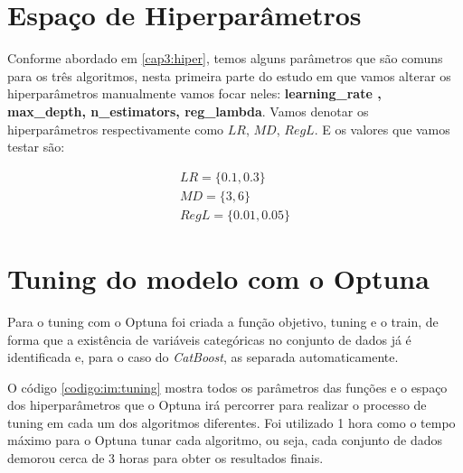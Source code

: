 \section{Espaço de Hiperparâmetros}
Conforme abordado em \ref{cap3:hiper}, temos alguns parâmetros que são comuns para os três algoritmos, nesta primeira parte do estudo em que vamos alterar os hiperparâmetros manualmente vamos focar neles: \textbf{learning\_rate , max\_depth, n\_estimators, reg\_lambda}. Vamos denotar os hiperparâmetros respectivamente como $LR$, $MD$, $RegL$. E os valores que vamos testar são:

\begin{gather*}
    LR = \{0.1,0.3\}\\
    MD = \{3,6\}\\
    RegL = \{0.01,0.05\}
\end{gather*}
\section{Tuning do modelo com o Optuna}
Para o tuning com o Optuna foi criada a função objetivo, tuning e o train, de forma que a existência de variáveis categóricas no conjunto de dados já é identificada e, para o caso do \textit{CatBoost}, as separada automaticamente.

O código \ref{codigo:im:tuning} mostra todos os parâmetros das funções e o espaço dos hiperparâmetros que o Optuna irá percorrer para realizar o processo de tuning em cada um dos algoritmos diferentes. Foi utilizado 1 hora como o tempo máximo para o Optuna tunar cada algoritmo, ou seja, cada conjunto de dados demorou cerca de 3 horas para obter os resultados finais.

